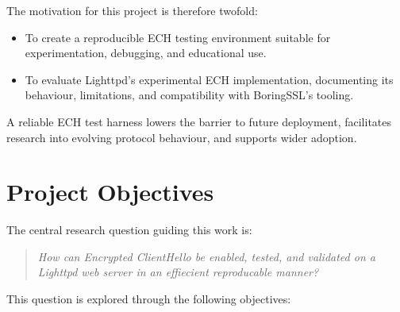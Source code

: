 The motivation for this project is therefore twofold:
\begin{itemize}
    \item To create a reproducible ECH testing environment suitable for experimentation, debugging, and educational use.
    \item To evaluate Lighttpd's experimental ECH implementation, documenting its behaviour, limitations, and compatibility with BoringSSL's tooling.
\end{itemize}

A reliable ECH test harness lowers the barrier to future deployment, facilitates research into evolving protocol behaviour, and supports wider adoption.

\section{Project Objectives}

The central research question guiding this work is:

\begin{quote}
\emph{How can Encrypted ClientHello be enabled, tested, and validated on a Lighttpd web server in an effiecient reproducable manner?}
\end{quote}

This question is explored through the following objectives:


